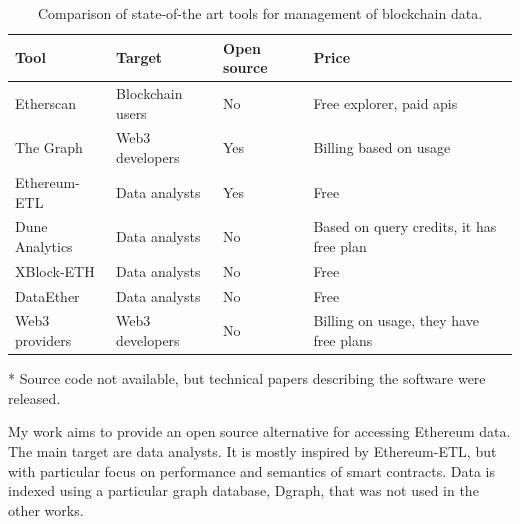 \begin{table}[ht!]
\centering
    \begin{threeparttable}
    \begin{tabular}  { m{3cm} m{3cm} m{1.5cm} m{5cm} } 
    \toprule
    \textbf{Tool} & \textbf{Target} & \textbf{Open source} & \textbf{Price}  \\
    \midrule
    Etherscan    & Blockchain users  & No & Free explorer, paid apis  \\[2.3ex]
    The Graph     & Web3 developers & Yes & Billing based on usage  \\[1.3ex]
    Ethereum-ETL     & Data analysts & Yes & Free  \\[1.3ex]
    Dune Analytics      & Data analysts & No & Based on query credits, it has free plan \\[2.6ex]
    XBlock-ETH  & Data analysts & No\tnote{*} & Free   \\[1.3ex]
    DataEther  & Data analysts & No\tnote{*} & Free   \\[1.3ex]
    Web3 providers      & Web3 developers & No & Billing on usage, they have free plans   \\[1.6ex]
    \bottomrule
    \end{tabular}
    \begin{tablenotes}
      \item[*] Source code not available, but technical papers describing the software were released.
      \end{tablenotes}
    \end{threeparttable}
\caption[State of the art tools comparison]{Comparison of state-of-the art tools for management of blockchain data.}
\label{table:tools-comparison}
\end{table}

My work aims to provide an open source alternative for accessing Ethereum data. The main target are data analysts. It is mostly inspired by Ethereum-ETL, but with particular focus on performance and semantics of smart contracts. Data is indexed using a particular graph database, Dgraph, that was not used in the other works.
